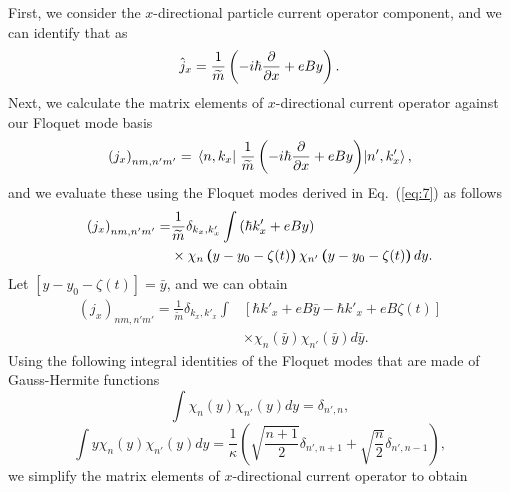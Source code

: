 \documentclass[
 reprint,
 amsmath,amssymb,
 aps,
 prb,
]{revtex4-2}
\begin{document}
{First, we consider the $x$-directional particle current operator component, and we can identify that as
\begin{equation} \label{eq:d4}
  \hat{j}_x = \frac{1}{\widetilde{m}} \left(-i\hbar\pdv{x} + eBy \right).
\end{equation}
Next, we calculate the matrix elements of $x$-directional current operator against our Floquet mode basis
\begin{equation} \label{eq:d5}
  \left({j}_x \right)_{nm,n'm'} =
  \mel{n,k_x}{\;\frac{1}{\widetilde{m}} \left(-i\hbar\pdv{x} + eBy \right)}{n',k'_x},
\end{equation}
and we evaluate these using the Floquet modes derived in Eq.~(\ref{eq:7}) as follows
\begin{equation} \label{eq:d6}
  \begin{aligned}
    \left({j}_x \right)_{nm,n'm'} = &
    \frac{1}{{\widetilde{m}}}
    \delta_{k_x,k'_x}
    \int
    \left(\hbar k'_x + eBy\right) \\
    & \times
     \chi_{n}\bm{\left(}y - y_0 - \zeta(t)\bm{\right)}
    \chi_{n'}\bm{\left(}y - y_0 - \zeta(t)\bm{\right)}
    dy.
  \end{aligned}
\end{equation}
Let $[y - y_0 - \zeta(t)] = \bar{y}$, and we can obtain
\begin{equation} \label{eq:d7}
  \begin{aligned}
    \left({j}_x \right)_{nm,n'm'} =
    \frac{1}{{\widetilde{m}}}
    \delta_{k_x,k'_x}
    \int &
    \left[ \hbar k'_x + eB\bar{y} -\hbar k'_x + eB\zeta(t)\right] \\
    & \times
    \chi_{n}(\bar{y})
    \chi_{n'}(\bar{y})
    d\bar{y}.
  \end{aligned}
\end{equation}
Using the following integral identities of the Floquet modes that are made of Gauss-Hermite functions \cite{vedenyapin11,szego59,boyd18}
\begin{equation} \label{eq:d8}
  \int \chi_{n}({y})
  \chi_{n'}({y}) d{y} = \delta_{n',n},
\end{equation}
\begin{equation} \label{eq:d9}
    \int
    y \chi_{n}({y})\chi_{n'}({y}) d{y} =
    \frac{1}{\kappa}
    \left(\sqrt{\frac{n+1}{2}} \delta_{n',n+1} + \sqrt{\frac{n}{2}}
    \delta_{n',n-1} \right),
\end{equation}
we simplify the matrix elements of $x$-directional current operator to obtain
\begin{equation} \label{eq:d10}

\end{equation}}
\end{document}
